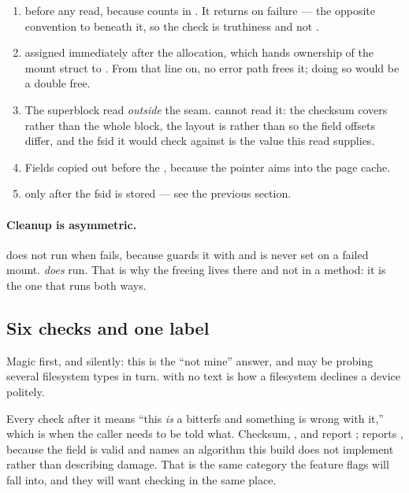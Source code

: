 \begin{enumerate}
\item {} before any read, because 
      counts in . It returns  on failure ---
      the opposite convention to  beneath it, so the
      check is truthiness and not .
\item {} assigned immediately after the allocation, which
      hands ownership of the mount struct to . From that line
      on, no error path frees it; doing so would be a double free.
\item The superblock read \emph{outside} the seam.  cannot
      read it: the checksum covers  rather than the whole block, the
      layout is  rather than  so the
      field offsets differ, and the fsid it would check against is the value
      this read supplies.
\item Fields copied out before the , because the pointer aims
      into the page cache.
\item {} only after the fsid is stored --- see the
      previous section.
\end{enumerate}

\paragraph{Cleanup is asymmetric.}  does not run when
 fails, because  guards it
with  and  is never set on a failed
mount.  \emph{does} run. That is why the freeing lives there
and not in a  method: it is the one that runs both ways.

\subsection{Six checks and one label}

Magic first, and silently: this is the ``not mine'' answer, and 
may be probing several filesystem types in turn.  with no text is
how a filesystem declines a device politely.

Every check after it means ``this \emph{is} a bitterfs and something is wrong
with it,'' which is when the caller needs to be told what. Checksum,
,  and  report
;  reports , because the
field is valid and names an algorithm this build does not implement rather than
describing damage. That is the same category the feature flags will fall into,
and they will want checking in the same place.

